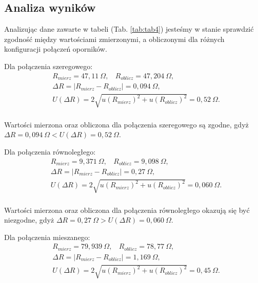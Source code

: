 \documentclass[12pt,a4paper]{article}
\numberwithin{equation}{section}
\begin{document}
\subsection{Analiza wyników}

Analizując dane zawarte w tabeli (Tab. \ref{tab:tab4}) jesteśmy w stanie sprawdzić zgodność między wartościami zmierzonymi, a obliczonymi dla różnych konfiguracji połączeń oporników.

Dla połączenia szeregowego: 
\begin{equation}
	\begin{split}
	& R_{mierz} = 47,11~\Omega,~~~~R_{oblicz} = 47,204~\Omega, \\
	& \Delta R = \Big| R_{mierz} - R_{oblicz} \Big| = 0,094~\Omega, \\
	& U(\Delta R) = 2 \sqrt{u(R_{mierz})^2 + u(R_{oblicz})^2} = 0,52~\Omega. \\
	\end{split}
\end{equation}

Wartości mierzona oraz obliczona dla połączenia szeregowego są zgodne, gdyż $\Delta R = 0,094~\Omega < U(\Delta R) = 0,52~\Omega$.

Dla połączenia równoległego: 
\begin{equation}
\begin{split}
& R_{mierz} = 9,371~\Omega,~~~~R_{oblicz} = 9,098~\Omega, \\
& \Delta R = \Big| R_{mierz} - R_{oblicz} \Big| = 0,27~\Omega, \\
& U(\Delta R) = 2 \sqrt{u(R_{mierz})^2 + u(R_{oblicz})^2} = 0,060~\Omega. \\
\end{split}
\end{equation}

Wartości mierzona oraz obliczona dla połączenia równoległego okazują się być niezgodne, gdyż $\Delta R = 0,27~\Omega > U(\Delta R) = 0,060~\Omega$.

Dla połączenia mieszanego: 
\begin{equation}
\begin{split}
& R_{mierz} = 79,939~\Omega,~~~~R_{oblicz} = 78,77~\Omega, \\
& \Delta R = \Big| R_{mierz} - R_{oblicz} \Big| = 1,169~\Omega, \\
& U(\Delta R) = 2 \sqrt{u(R_{mierz})^2 + u(R_{oblicz})^2} = 0,45~\Omega. \\
\end{split}
\end{equation}
\end{document}
